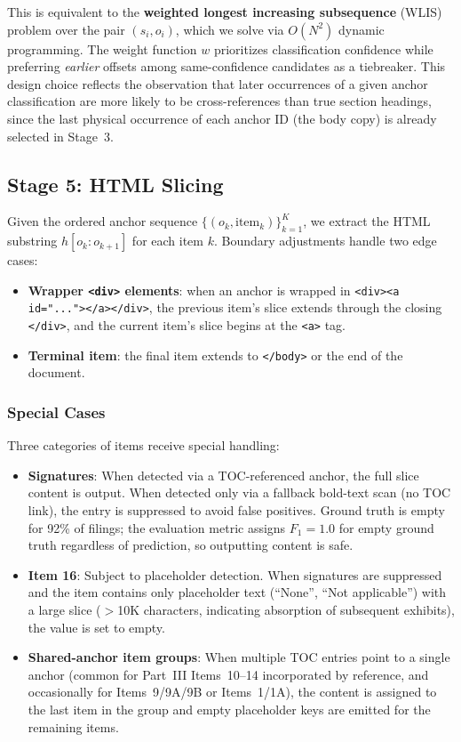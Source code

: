 \documentclass[12pt,letterpaper,oneside]{article}
\begin{document}
This is equivalent to the \textbf{weighted longest increasing
subsequence} (WLIS) problem over the pair $(s_i, o_i)$, which we
solve via $O(N^2)$ dynamic programming. The weight function $w$
prioritizes classification confidence while preferring \emph{earlier}
offsets among same-confidence candidates as a tiebreaker. This
design choice reflects the observation that later occurrences of a
given anchor classification are more likely to be cross-references
than true section headings, since the last physical occurrence of
each anchor ID (the body copy) is already selected in Stage~3.

\subsection{Stage 5: HTML Slicing}

Given the ordered anchor sequence $\{(o_k, \text{item}_k)\}_{k=1}^{K}$,
we extract the HTML substring $h[o_k : o_{k+1}]$ for each item $k$.
Boundary adjustments handle two edge cases:
\begin{itemize}
  \item \textbf{Wrapper \texttt{<div>} elements}: when an anchor is
    wrapped in \texttt{<div><a id="...">\allowbreak</a></div>}, the
    previous item's slice extends through the closing \texttt{</div>},
    and the current item's slice begins at the \texttt{<a>} tag.
  \item \textbf{Terminal item}: the final item extends to
    \texttt{</body>} or the end of the document.
\end{itemize}

\subsubsection{Special Cases}

Three categories of items receive special handling:

\begin{itemize}
  \item \textbf{Signatures}: When detected via a TOC-referenced
    anchor, the full slice content is output. When detected only via
    a fallback bold-text scan (no TOC link), the entry is suppressed
    to avoid false positives. Ground truth is empty for 92\% of
    filings; the evaluation metric assigns $F_1 = 1.0$ for empty
    ground truth regardless of prediction, so outputting content is
    safe.

  \item \textbf{Item 16}: Subject to placeholder detection. When
    signatures are suppressed and the item contains only placeholder
    text (``None'', ``Not applicable'') with a large slice ($>$10K
    characters, indicating absorption of subsequent exhibits), the
    value is set to empty.

  \item \textbf{Shared-anchor item groups}: When multiple TOC
    entries point to a single anchor (common for Part~III Items~10--14
    incorporated by reference, and occasionally for Items~9/9A/9B or
    Items~1/1A), the content is assigned to the last item in the
    group and empty placeholder keys are emitted for the remaining
    items.
\end{itemize}
\end{document}
